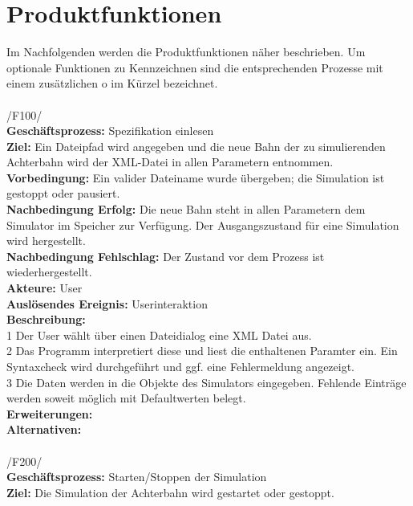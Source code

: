 
\chapter{Produktfunktionen}

Im Nachfolgenden werden die Produktfunktionen näher beschrieben. Um optionale Funktionen zu Kennzeichnen sind die entsprechenden Prozesse mit einem zusätzlichen o im Kürzel bezeichnet.
\\ \\ 

/F100/\\
\textbf{Geschäftsprozess:} Spezifikation einlesen \\
\textbf{Ziel:} Ein Dateipfad wird angegeben und die neue Bahn der zu simulierenden Achterbahn wird der XML-Datei in allen Parametern entnommen. \\
\textbf{Vorbedingung:} Ein valider Dateiname wurde übergeben; die Simulation ist gestoppt oder pausiert. \\
\textbf{Nachbedingung Erfolg:} Die neue Bahn steht in allen Parametern dem Simulator im Speicher zur Verfügung. Der Ausgangszustand für eine Simulation wird hergestellt. \\
\textbf{Nachbedingung Fehlschlag:} Der Zustand vor dem Prozess ist wiederhergestellt. \\
\textbf{Akteure:} User \\
\textbf{Auslösendes Ereignis:} Userinteraktion \\
\textbf{Beschreibung:} \\
1 Der User wählt über einen Dateidialog eine XML Datei aus. \\
2 Das Programm interpretiert diese und liest die enthaltenen Paramter ein. Ein Syntaxcheck wird durchgeführt und ggf. eine Fehlermeldung angezeigt.\\
3 Die Daten werden in die Objekte des Simulators eingegeben. Fehlende Einträge werden soweit möglich mit Defaultwerten belegt.\\
\textbf{Erweiterungen:}\\
\textbf{Alternativen:}\\
\\
/F200/\\
\textbf{Geschäftsprozess:} Starten/Stoppen der Simulation\\
\textbf{Ziel:} Die Simulation der Achterbahn wird gestartet oder gestoppt.\\
